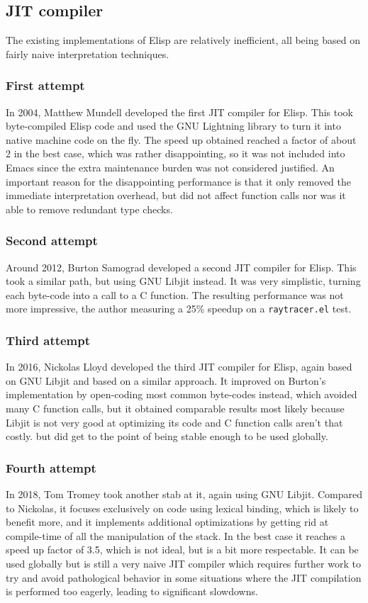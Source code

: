 \documentclass[format=acmsmall, review=false, screen=true]{acmart}
\newcommand \Elisp {Elisp}
\begin{document}
\subsection{JIT compiler}

The existing implementations of \Elisp{} are relatively inefficient, all
being based on fairly naive interpretation techniques.

\subsubsection{First attempt}
In 2004, Matthew Mundell developed the first JIT compiler for \Elisp.
This took byte-compiled \Elisp{} code and used the GNU Lightning library to
turn it into native machine code on the fly.
The speed up obtained reached a factor of about 2 in the best case, which
was rather disappointing, so it was not included into Emacs since the extra
maintenance burden was not considered justified.
An important reason for the disappointing performance is that it only
removed the immediate interpretation overhead, but did not affect function
calls nor was it able to remove redundant type checks.

\subsubsection{Second attempt}
Around 2012, Burton Samograd developed a second JIT compiler for \Elisp.
This took a similar path, but using GNU Libjit instead.  It was very
simplistic, turning each byte-code into a call to a C function.
The resulting performance was not more impressive, the author measuring
a 25\% speedup on a \texttt{raytracer.el} test.

\subsubsection{Third attempt}
In 2016, Nickolas Lloyd developed the third JIT compiler for \Elisp, again
based on GNU Libjit and based on a similar approach.  It improved on
Burton's implementation by open-coding most common byte-codes instead, which
avoided many C function calls, but it obtained comparable results most
likely because Libjit is not very good at optimizing its code and C function
calls aren't that costly.  but did get to the point of being stable enough
to be used globally.

\subsubsection{Fourth attempt}
In 2018, Tom Tromey took another stab at it, again using GNU Libjit.
Compared to Nickolas, it focuses exclusively on code using lexical binding,
which is likely to benefit more, and it implements additional optimizations
by getting rid at compile-time of all the manipulation of the stack.
In the best case it reaches a speed up factor of 3.5, which is not ideal,
but is a bit more respectable.  It can be used globally but is still
a very naive JIT compiler which requires further work to try and avoid
pathological behavior in some situations where the JIT compilation is
performed too eagerly, leading to significant slowdowns.
\end{document}
